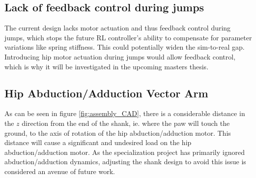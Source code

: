 \subsection{Lack of feedback control during jumps}
The current design lacks motor actuation and thus feedback control during jumps, which stops the future RL controller's ability to compensate for parameter variations like spring stiffness. This could potentially widen the sim-to-real gap. Introducing hip motor actuation during jumps would allow feedback control, which is why it will be investigated in the upcoming masters thesis.

\subsection{Hip Abduction/Adduction Vector Arm}
\label{sec:hip_abduction_adduction_vector_arm}

As can be seen in figure \ref{fig:assembly_CAD}, there is a considerable distance in the $z$ direction from the end of the shank, ie. where the paw will touch the ground, to the axis of rotation of the hip abduction/adduction motor. This distance will cause a significant and undesired load on the hip abduction/adduction motor. As the specialization project has primarily ignored abduction/adduction dynamics, adjusting the shank design to avoid this issue is considered an avenue of future work.

